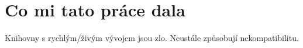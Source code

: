 \chapter{Co mi tato práce dala}
Knihovny s rychlým/živým vývojem jsou zlo. Neustále způsobují nekompatibilitu.